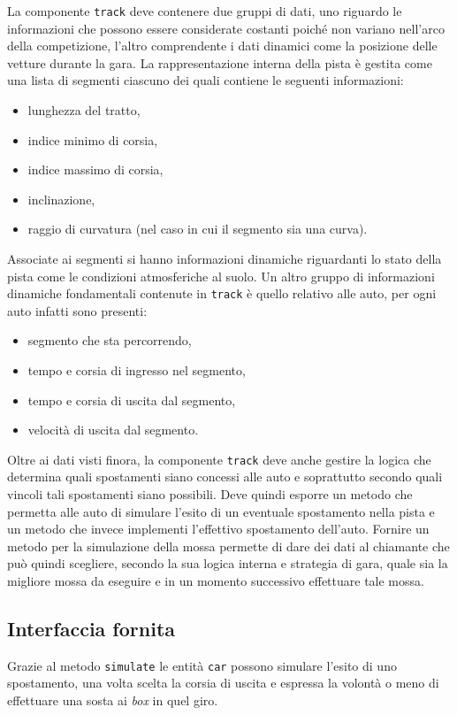 \documentclass[a4paper]{report}
\newcommand{\fun}[1]{\texttt{#1}}
\begin{document}
La componente \texttt{track} deve contenere due gruppi di dati, uno riguardo le informazioni che possono essere considerate costanti poiché non variano nell'arco della competizione, l'altro comprendente i dati dinamici come la posizione delle vetture durante la gara.
La rappresentazione interna della pista è gestita come una lista di segmenti ciascuno dei quali contiene le seguenti informazioni:
\begin{itemize}
\item lunghezza del tratto,
\item indice minimo di corsia,
\item indice massimo di corsia,
\item inclinazione,
\item raggio di curvatura (nel caso in cui il segmento sia una curva).
\end{itemize}
Associate ai segmenti si hanno informazioni dinamiche riguardanti lo stato della pista come le condizioni atmosferiche al suolo.
Un altro gruppo di informazioni dinamiche fondamentali contenute in \texttt{track} è quello relativo alle auto, per ogni auto infatti sono presenti:
\begin{itemize}
\item segmento che sta percorrendo,
\item tempo e corsia di ingresso nel segmento,
\item tempo e corsia di uscita dal segmento,
\item velocità di uscita dal segmento.
\end{itemize}

Oltre ai dati visti finora, la componente \texttt{track} deve anche gestire la logica che determina quali spostamenti siano concessi alle auto e soprattutto secondo quali vincoli tali spostamenti siano possibili. Deve quindi esporre un metodo che permetta alle auto di simulare l'esito di un eventuale spostamento nella pista e un metodo che invece implementi l'effettivo spostamento dell'auto. Fornire un metodo per la simulazione della mossa permette di dare dei dati al chiamante che può quindi scegliere, secondo la sua logica interna e strategia di gara, quale sia la migliore mossa da eseguire e in un momento successivo effettuare tale mossa.

\subsection*{Interfaccia fornita}
Grazie al metodo \fun{simulate} le entità \texttt{car} possono simulare l'esito di uno spostamento, una volta scelta la corsia di uscita e espressa la volontà o meno di effettuare una sosta ai \textit{box} in quel giro.
\end{document}
